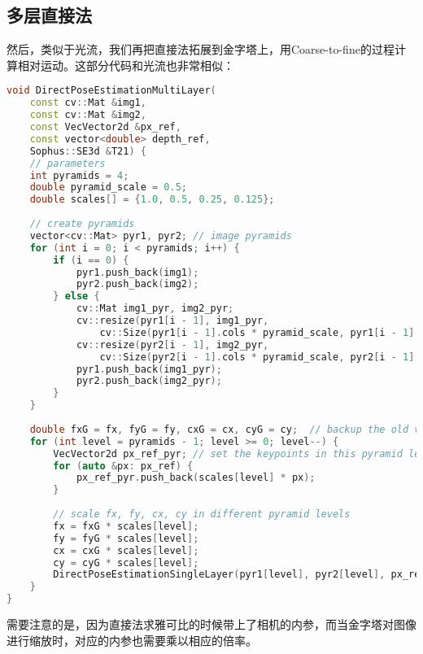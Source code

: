 \subsection{多层直接法}
然后，类似于光流，我们再把直接法拓展到金字塔上，用Coarse-to-fine的过程计算相对运动。这部分代码和光流也非常相似：
\begin{lstlisting}[language=c++,caption=slambook2/ch8/direct_method.cpp（片段）]
void DirectPoseEstimationMultiLayer(
	const cv::Mat &img1,
	const cv::Mat &img2,
	const VecVector2d &px_ref,
	const vector<double> depth_ref,
	Sophus::SE3d &T21) {
	// parameters
	int pyramids = 4;
	double pyramid_scale = 0.5;
	double scales[] = {1.0, 0.5, 0.25, 0.125};
	
	// create pyramids
	vector<cv::Mat> pyr1, pyr2; // image pyramids
	for (int i = 0; i < pyramids; i++) {
		if (i == 0) {
			pyr1.push_back(img1);
			pyr2.push_back(img2);
		} else {
			cv::Mat img1_pyr, img2_pyr;
			cv::resize(pyr1[i - 1], img1_pyr,
				cv::Size(pyr1[i - 1].cols * pyramid_scale, pyr1[i - 1].rows * pyramid_scale));
			cv::resize(pyr2[i - 1], img2_pyr,
				cv::Size(pyr2[i - 1].cols * pyramid_scale, pyr2[i - 1].rows * pyramid_scale));
			pyr1.push_back(img1_pyr);
			pyr2.push_back(img2_pyr);
		}
	}
	
	double fxG = fx, fyG = fy, cxG = cx, cyG = cy;  // backup the old values
	for (int level = pyramids - 1; level >= 0; level--) {
		VecVector2d px_ref_pyr; // set the keypoints in this pyramid level
		for (auto &px: px_ref) {
			px_ref_pyr.push_back(scales[level] * px);
		}
		
		// scale fx, fy, cx, cy in different pyramid levels
		fx = fxG * scales[level];
		fy = fyG * scales[level];
		cx = cxG * scales[level];
		cy = cyG * scales[level];
		DirectPoseEstimationSingleLayer(pyr1[level], pyr2[level], px_ref_pyr, depth_ref, T21);
	}	
}
\end{lstlisting}
需要注意的是，因为直接法求雅可比的时候带上了相机的内参，而当金字塔对图像进行缩放时，对应的内参也需要乘以相应的倍率。

